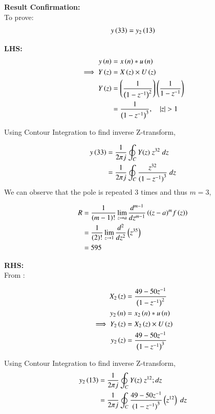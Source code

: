 \documentclass[journal,12pt,onecolumn]{IEEEtran}
\theoremstyle{remark}
\begin{document}
\textbf{Result Confirmation:}\\

To prove:\\
\begin{equation}
y\left(33\right)=y_2\left(13\right)
\end{equation}

\textbf{LHS:}\\

\begin{align}
y\left(n\right)&=x\left(n\right)*u\left(n\right)\\
\implies Y\left(z\right)&=X\left(z\right) \times U\left(z\right)\\
Y\left(z\right)&=\left(\frac{1}{\left(1-z^{-1}\right)^2}\right)\left(\frac{1}{1-z^{-1}}\right)\\
&=\frac{1}{\left(1-z^{-1}\right)^3},\quad \left\vert z\right\vert>1\\
\end{align}

Using Contour Integration to find inverse Z-transform,

\begin{align}
y\left(33\right)&=\frac{1}{2\pi j}\oint_{C}Y(z) \;z^{32} \;dz\\
 &=\frac{1}{2\pi j}\oint_{C}\frac{z^{32}}{({1-z^{-1})}^{3}} \;dz 
\end{align}
We can observe that the pole is repeated $3$ times and thus $m=3$,

\begin{align}
R&=\frac{1}{\left(m-1\right)!}\lim\limits_{z\to a}\frac{d^{m-1}}{dz^{m-1}}\left({(z-a)}^{m}f\left(z\right)\right) \\
&=\frac{1}{\left(2\right)!}\lim\limits_{z\to 1}\frac{d^{2}}{dz^{2}}\left(z^{35}\right)\\
&=595
\end{align}

\newpage
\textbf{RHS:}\\
From :

\begin{align}
X_2\left(z\right)&=\frac{49-50z^{-1}}{\left(1-z^{-1}\right)^{2}}\\
y_2\left(n\right)&=x_2\left(n\right)*u\left(n\right)\\
\implies Y_2\left(z\right)&=X_2\left(z\right) \times U\left(z\right)\\
y_2\left(z\right)&=\frac{49-50z^{-1}}{\left(1-z^{-1}\right)^{3}}\\
\end{align}

Using Contour Integration to find inverse Z-transform,
\begin{align}
y_2\left(13\right)&=\frac{1}{2\pi j}\oint_{C}Y(z) \;z^{12} ;dz\\
 &=\frac{1}{2\pi j}\oint_{C}\frac{49-50z^{-1}}{({1-z^{-1})}^{3}}\left(z^{12}\right) \;dz 
\end{align}
\end{document}
